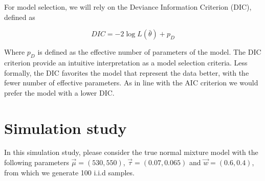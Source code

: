 \documentclass{article}
\begin{document}
For model selection, we will rely on the Deviance Information Criterion (DIC), defined as

\begin{equation}
DIC = - 2 \log L(\bar{\theta}) + p_D
\end{equation}

Where $p_D$ is defined as the effective number of parameters of the model. The DIC criterion provide an intuitive interpretation as a model selection criteria. Less formally, the DIC favorites the model that represent the data better, with the fewer number of effective parameters. As in line with the AIC criterion we would prefer the model with a lower DIC. %

\section{Simulation study}
In this simulation study, please consider the true normal mixture model with the following parameters $\vec \mu  = (530,550)$, $\vec \tau = (0.07, 0.065)$ and $\vec w = (0.6, 0.4)$, from which we generate 100 i.i.d samples.
\end{document}
